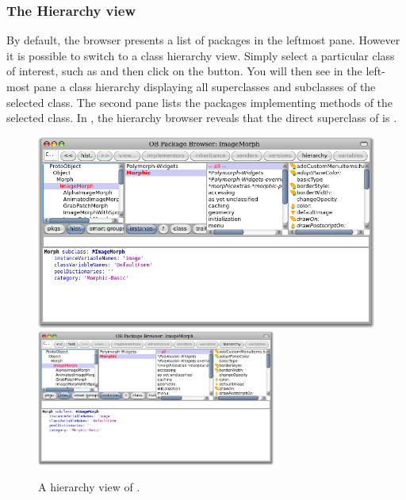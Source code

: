 \documentclass[a4paper,10pt,twoside]{book}
\begin{document}
\subsubsection{The Hierarchy view}

By default, the browser presents a list of packages in the leftmost pane.
However it is possible to switch to a class hierarchy view.
Simply select a particular class of interest, such as  and then click on the  button.
You will then see in the left-most pane a class hierarchy displaying all superclasses and subclasses of the selected class.
The second pane lists the packages implementing methods of the selected class.
In , the hierarchy browser reveals that the direct superclass of  is .

\begin{figure}[btp]
	\begin{center}
	\ifluluelse
		{\includegraphics[width=\textwidth]{hierarchyBrowser}}
		{\includegraphics[width=0.7\textwidth]{hierarchyBrowser}}
	\end{center}
	\caption{A hierarchy view of .}
\end{figure}
\end{document}
